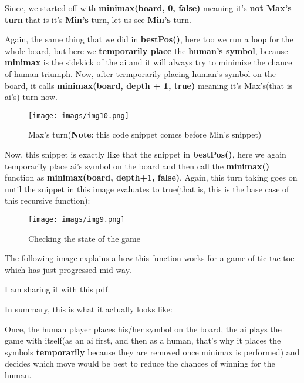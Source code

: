 \documentclass{article}
\begin{document}
Since, we started off with \textbf{minimax(board, 0, false)} meaning it's \textbf{not Max's turn} that is it's \textbf{Min's} turn, let us see \textbf{Min's} turn.

Again, the same thing that we did in \textbf{bestPos()}, here too we run a loop for the whole board, but here we \textbf{temporarily place} the \textbf{human's symbol}, because \textbf{minimax} is the sidekick of the ai and it will always try to minimize the chance of human triumph. Now, after termporarily placing human's symbol on the board, it calls \textbf{minimax(board, depth + 1, true)} meaning it's Max's(that is ai's) turn now.
\newpage
\begin{figure}[h]
	\centering
	\texttt{[image: imags/img10.png]}
	\caption{Max's turn(\textbf{Note}: this code snippet comes before Min's snippet)}
	\label{fig:fig10}
\end{figure}

Now, this snippet is exactly like that the snippet in \textbf{bestPos()}, here we again temporarily place ai's symbol on the board and then call the \textbf{minimax()} function as \textbf{minimax(board, depth+1, false)}.
\newpage
Again, this turn taking goes on until the snippet in this image evaluates to true(that is, this is the base case of this recursive function):

\begin{figure}[h]
	\centering
	\texttt{[image: imags/img9.png]}
	\caption{Checking the state of the game}
	\label{fig:fig12}
\end{figure}

The following image explains a how this function works for a game of tic-tac-toe which has just progressed mid-way.

I am sharing it with this pdf.

\vspace{5cm}
In summary, this is what it actually looks like:


Once, the human player places his/her symbol on the board, the ai plays the game with itself(as an ai first, and then as a human, that's why it places the symbols \textbf{temporarily} because they are removed once minimax is performed) and decides which move would be best to reduce the chances of winning for the human.
\end{document}
